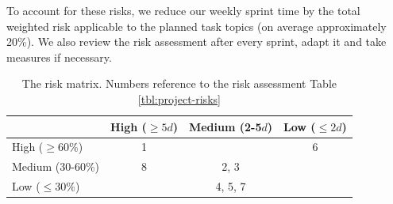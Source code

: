 To account for these risks, we reduce our weekly sprint time by the total weighted risk applicable to the planned task topics (on average approximately 20\%). We also review the risk assessment after every sprint, adapt it and take measures if necessary.


\begin{table}[h]
	\centering
	\begin{tabu}{|l|c|c|c|}
		\hline
		  & High ($\geq 5d$) & Medium (2-5$d$) & Low ($\leq 2d$) \\ \hline
		High ($\geq 60\%$)
	      & 1 & & 6\\ \hline
		Medium (30-60\%)
		  & 8 & 2, 3 &  \\ \hline
		Low ($\leq 30\%$)
		  & & 4, 5, 7 & \\ \hline
	\end{tabu}
	\caption[Risk matrix]{The risk matrix. Numbers reference to the risk assessment Table \ref{tbl:project-risks}}
	\label{tbl:risk-matrix}
\end{table}


